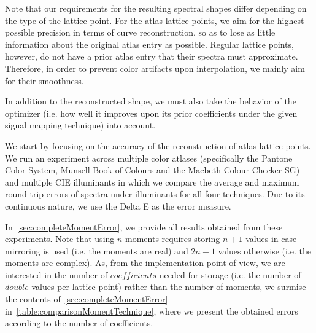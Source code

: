 Note that our requirements for the resulting spectral shapes differ depending on the type of the lattice point. For the atlas lattice points, we aim for the highest possible precision in terms of curve reconstruction, so as to lose as little information about the original atlas entry as possible. Regular lattice points, however, do not have a prior atlas entry that their spectra must approximate. Therefore, in order to prevent color artifacts upon interpolation, we mainly aim for their smoothness.

In addition to the reconstructed shape, we must also take the behavior of the optimizer (i.e. how well it improves upon its prior coefficients under the given signal mapping technique) into account.

We start by focusing on the accuracy of the reconstruction of atlas lattice points. We run an experiment across multiple color atlases (specifically the Pantone Color System, Munsell Book of Colours and the Macbeth Colour Checker SG) and multiple CIE illuminants in which we compare the average and maximum round-trip errors of spectra under illuminants for all four techniques. Due to its continuous nature, we use the Delta E as the error measure.

In~\cref{sec:completeMomentError}, we provide all results obtained from these experiments. Note that using $n$ moments requires storing $n+1$ values in case mirroring is used (i.e. the moments are real) and $2n+1$ values otherwise (i.e. the moments are complex). As, from the implementation point of view, we are interested in the number of $coefficients$ needed for storage (i.e. the number of $double$ values per lattice point) rather than the number of moments, we surmise the contents of~\cref{sec:completeMomentError} in~\cref{table:comparisonMomentTechnique}, where we present the obtained errors according to the number of coefficients.

